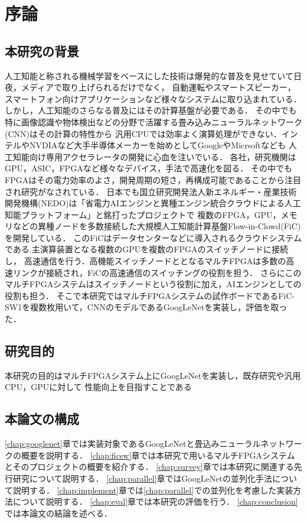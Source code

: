 \chapter{序論}
{
    \label{chap:introducion}

    \section{本研究の背景}
    \label{sec:backgroud}
    人工知能と称される機械学習をベースにした技術は爆発的な普及を見せていて日夜，メディアで取り上げられるだけでなく，
    自動運転やスマートスピーカー，スマートフォン向けアプリケーションなど様々なシステムに取り込まれている．
    しかし，人工知能のさらなる普及にはその計算基盤が必要である．
    その中でも特に画像認識や物体検出などの分野で活躍する畳み込みニューラルネットワーク(CNN)はその計算の特性から
    汎用CPUでは効率よく演算処理ができない．インテルやNVDIAなど大手半導体メーカーを始めとしてGoogleやMicrsoftなども
    人工知能向け専用アクセラレータの開発に心血を注いでいる．
    各社，研究機関はGPU，ASIC，FPGAなど様々なデバイス，手法で高速化を図る．
    その中でもFPGAはその電力効率のよさ，開発周期の短さ，再構成可能であることから注目され研究がなされている．
    日本でも国立研究開発法人新エネルギー・産業技術開発機構(NEDO)は「省電力AIエンジンと異種エンジン統合クラウドによる人工知能プラットフォーム」と銘打ったプロジェクトで
    複数のFPGA，GPU，メモリなどの異種ノードを多数接続した大規模人工知能計算基盤Flow-in-Clowd(FiC)を開発している．
    このFiCはデータセンターなどに導入されるクラウドシステムである.主演算装置となる複数のGPUを複数のFPGAのスイッチノードに接続し，
    高速通信を行う．高機能スイッチノードととなるマルチFPGAは多数の高速リンクが接続され，FiCの高速通信のスイッチングの役割を担う．
    さらにこのマルチFPGAシステムはスイッチノードという役割に加え，AIエンジンとしての役割も担う．
    そこで本研究ではマルチFPGAシステムの試作ボードであるFiC-SW1を複数枚用いて，CNNのモデルであるGoogLeNetを実装し，評価を取った．

    \section{研究目的}
    \label{sec:purpose}
    本研究の目的はマルチFPGAシステム上にGoogLeNetを実装し，既存研究や汎用CPU，GPUに対して
    性能向上を目指すことである

    \section{本論文の構成}
    \label{sec:composition}
    \ref{chap:googlenet}章では実装対象であるGoogLeNetと畳込みニューラルネットワークの概要を説明する．
    \ref{chap:ficsw}章では本研究で用いるマルチFPGAシステムとそのプロジェクトの概要を紹介する．
    \ref{chap:survey}章では本研究に関連する先行研究について説明する．
    \ref{chap:parallel}章ではGoogLeNetの並列化手法について説明する．
    \ref{chap:implement}章では\ref{chap:parallel}での並列化を考慮した実装方法について説明する． 
    \ref{chap:eval}章では本研究の評価を行う． 
    \ref{chap:conclusion}では本論文の結論を述べる．
}

